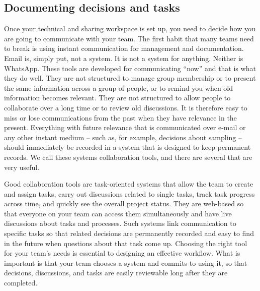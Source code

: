 \subsection{Documenting decisions and tasks}

Once your technical and sharing workspace is set up,
you need to decide how you are going to communicate with your team.
The first habit that many teams need to break
is using instant communication for management and documentation.
Email is, simply put, not a system. It is not a system for anything. Neither is WhatsApp.
These tools are developed for communicating ``now'' and that is what they do well.
They are not structured to manage group membership or to present the same information
across a group of people, or to remind you when old information becomes relevant.
They are not structured to allow people to collaborate over a long time or to review old discussions.
It is therefore easy to miss or lose communications from the past when they have relevance in the present.
Everything with future relevance that is communicated over e-mail or any other instant medium
-- such as, for example, decisions about sampling --
should immediately be recorded in a system that is designed to keep permanent records.
We call these systems collaboration tools, and there are several that are very useful.

Good collaboration tools are task-oriented systems
that allow the team to create and assign tasks,
carry out discussions related to single tasks,
track task progress across time, and quickly see the overall project status.
They are web-based so that everyone on your team can access them simultaneously
and have live discussions about tasks and processes.
Such systems link communication to specific tasks so that
related decisions are permanently recorded
and easy to find in the future when questions about that task come up.
Choosing the right tool for your team's needs is essential to designing an effective workflow.
What is important is that your team chooses a system and commits to using it,
so that decisions, discussions, and tasks are easily reviewable long after they are completed.

